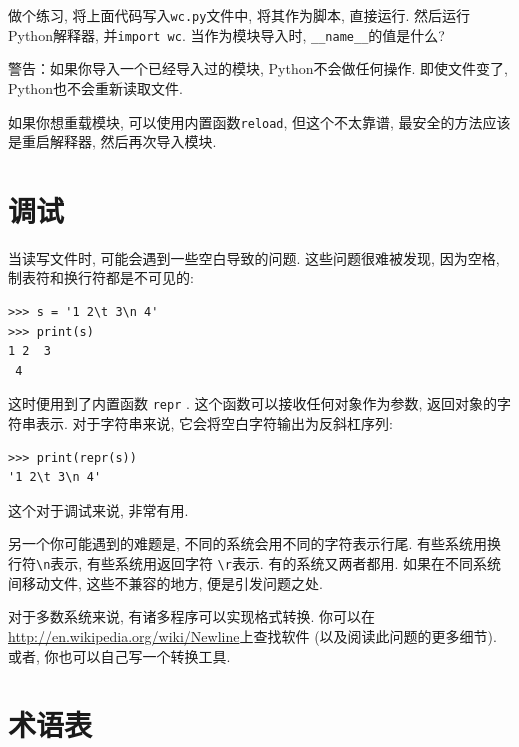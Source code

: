 \documentclass[10pt]{book}
\begin{document}
做个练习, 将上面代码写入{\tt wc.py}文件中, 将其作为脚本, 直接运行. 
然后运行Python解释器, 并{\tt import wc}. 
当作为模块导入时, \verb"__name__"的值是什么?

警告：如果你导入一个已经导入过的模块, Python不会做任何操作. 
即使文件变了, Python也不会重新读取文件. 

如果你想重载模块, 可以使用内置函数{\tt reload}, 
但这个不太靠谱, 最安全的方法应该是重启解释器, 然后再次导入模块. 

\section{调试}

当读写文件时, 可能会遇到一些空白导致的问题. 
这些问题很难被发现, 因为空格, 制表符和换行符都是不可见的:

\begin{verbatim}
>>> s = '1 2\t 3\n 4'
>>> print(s)
1 2	 3
 4
\end{verbatim}

这时便用到了内置函数 {\tt repr} . 
这个函数可以接收任何对象作为参数, 返回对象的字符串表示. 
对于字符串来说, 它会将空白字符输出为反斜杠序列:

\begin{verbatim}
>>> print(repr(s))
'1 2\t 3\n 4'
\end{verbatim}

这个对于调试来说, 非常有用. 

另一个你可能遇到的难题是, 不同的系统会用不同的字符表示行尾. 
有些系统用换行符\verb"\n"表示, 有些系统用返回字符 \verb"\r"表示. 
有的系统又两者都用. 
如果在不同系统间移动文件, 这些不兼容的地方, 便是引发问题之处. 

对于多数系统来说, 有诸多程序可以实现格式转换. 
你可以在\url{http://en.wikipedia.org/wiki/Newline}上查找软件
(以及阅读此问题的更多细节). 
或者, 你也可以自己写一个转换工具. 


\section{术语表}
\end{document}
